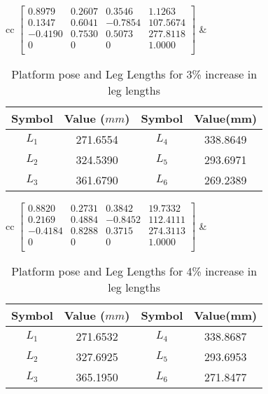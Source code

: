 \documentclass[10pt]{article}
\begin{document}
\begin{table*}[h!]
	\centering
	\begin{tabular}{cc}
		$\begin{bmatrix}
		0.8979  & 0.2607 & 0.3546  & 1.1263   \\ 
		0.1347  & 0.6041 & -0.7854 & 107.5674 \\ 
		-0.4190 & 0.7530 & 0.5073  & 277.8118 \\ 
		0       & 0      & 0       & 1.0000   \\ 
		\end{bmatrix}$
		& 
		\begin{tabular}{cccc}
			\hline
			Symbol & Value ($mm$) & Symbol & Value(mm) \\
			\hline
			$L_1$ & 271.6554 & $L_4$ & 338.8649\\
			$L_2$ & 324.5390 & $L_5$ & 293.6971\\
			$L_3$ & 361.6790 & $L_6$ & 269.2389\\	 	\hline
		\end{tabular}
	\end{tabular}
	\caption{Platform pose and Leg Lengths for 3\% increase in leg lengths}
\end{table*}

\begin{table*}[h!]
	\centering
	\begin{tabular}{cc}
		$\begin{bmatrix}
		0.8820  & 0.2731 & 0.3842  & 19.7332  \\ 
		0.2169  & 0.4884 & -0.8452 & 112.4111 \\ 
		-0.4184 & 0.8288 & 0.3715  & 274.3113 \\ 
		0       & 0      & 0       & 1.0000   \\ 
		\end{bmatrix}$
		& 
		\begin{tabular}{cccc}
			\hline
			Symbol & Value ($mm$) & Symbol & Value(mm) \\
			\hline
			$L_1$ & 271.6532 & $L_4$ & 338.8687\\
			$L_2$ & 327.6925 & $L_5$ & 293.6953\\
			$L_3$ & 365.1950 & $L_6$ & 271.8477\\	 	\hline
		\end{tabular}
	\end{tabular}
	\caption{Platform pose and Leg Lengths for 4\% increase in leg lengths}
\end{table*}
\end{document}
